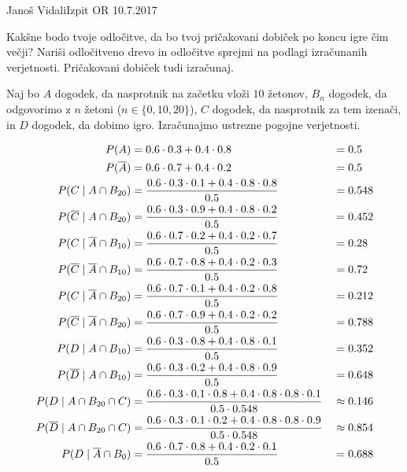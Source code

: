 \begin{naloga}{Janoš Vidali}{Izpit OR 10.7.2017}
\begin{vprasanje}
Kakšne bodo tvoje odločitve,
da bo tvoj pričakovani dobiček po koncu igre čim večji?
Nariši odločitveno drevo
in odločitve sprejmi na podlagi izračunanih verjetnosti.
Pričakovani dobiček tudi izračunaj.
\end{vprasanje}

\begin{odgovor}
Naj bo $A$ dogodek, da nasprotnik na začetku vloži $10$ žetonov,
$B_n$ dogodek, da odgovorimo z $n$ žetoni ($n \in \{0, 10, 20\}$),
$C$ dogodek, da nasprotnik za tem izenači,
in $D$ dogodek, da dobimo igro.
Izračunajmo ustrezne pogojne verjetnosti.

\begin{alignat*}{2}
P(A) &= 0.6 \cdot 0.3 + 0.4 \cdot 0.8 &&= 0.5 \\
P(\overline{A}) &= 0.6 \cdot 0.7 + 0.4 \cdot 0.2 &&= 0.5 \\
P(C \;|\; A \cap B_{20})
&= {0.6 \cdot 0.3 \cdot 0.1 + 0.4 \cdot 0.8 \cdot 0.8 \over 0.5} &&= 0.548 \\
P(\overline{C} \;|\; A \cap B_{20})
&= {0.6 \cdot 0.3 \cdot 0.9 + 0.4 \cdot 0.8 \cdot 0.2 \over 0.5} &&= 0.452 \\
P(C \;|\; \overline{A} \cap B_{10})
&= {0.6 \cdot 0.7 \cdot 0.2 + 0.4 \cdot 0.2 \cdot 0.7 \over 0.5} &&= 0.28 \\
P(\overline{C} \;|\; \overline{A} \cap B_{10})
&= {0.6 \cdot 0.7 \cdot 0.8 + 0.4 \cdot 0.2 \cdot 0.3 \over 0.5} &&= 0.72 \\
P(C \;|\; \overline{A} \cap B_{20})
&= {0.6 \cdot 0.7 \cdot 0.1 + 0.4 \cdot 0.2 \cdot 0.8 \over 0.5} &&= 0.212 \\
P(\overline{C} \;|\; \overline{A} \cap B_{20})
&= {0.6 \cdot 0.7 \cdot 0.9 + 0.4 \cdot 0.2 \cdot 0.2 \over 0.5} &&= 0.788 \\
P(D \;|\; A \cap B_{10})
&= {0.6 \cdot 0.3 \cdot 0.8 + 0.4 \cdot 0.8 \cdot 0.1 \over 0.5} &&= 0.352 \\
P(\overline{D} \;|\; A \cap B_{10})
&= {0.6 \cdot 0.3 \cdot 0.2 + 0.4 \cdot 0.8 \cdot 0.9 \over 0.5} &&= 0.648 \\
P(D \;|\; A \cap B_{20} \cap C)
&= {0.6 \cdot 0.3 \cdot 0.1 \cdot 0.8 + 0.4 \cdot 0.8 \cdot 0.8 \cdot 0.1
\over 0.5 \cdot 0.548} &&\approx 0.146 \\
P(\overline{D} \;|\; A \cap B_{20} \cap C)
&= {0.6 \cdot 0.3 \cdot 0.1 \cdot 0.2 + 0.4 \cdot 0.8 \cdot 0.8 \cdot 0.9
\over 0.5 \cdot 0.548} &&\approx 0.854 \\
P(D \;|\; \overline{A} \cap B_0)
&= {0.6 \cdot 0.7 \cdot 0.8 + 0.4 \cdot 0.2 \cdot 0.1 \over 0.5} &&= 0.688 \\

\end{alignat*}
\end{odgovor}
\end{naloga}
